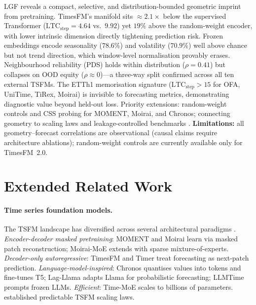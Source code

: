 \documentclass[10pt]{article}
\theoremstyle{definition}
\theoremstyle{remark}
\newcommand{\ltcstep}{\ensuremath{\mathrm{LTC}_{\mathrm{step}}}}
\begin{document}
LGF reveals a compact, selective, and distribution-bounded geometric imprint
from pretraining.
TimesFM's manifold sits ${\approx}2.1\times$ below the supervised Transformer
($\ltcstep{=}4.64$ vs.\ $9.92$) yet $19\%$ above the random-weight encoder,
with lower intrinsic dimension directly tightening prediction risk.
Frozen embeddings encode seasonality ($78.6\%$) and volatility ($70.9\%$)
well above chance but not trend direction, which window-level normalisation
provably erases.
Neighbourhood reliability (PDS) holds within distribution ($\rho{=}0.41$) but
collapses on OOD equity ($\rho{\approx}0$)---a three-way split confirmed across
all ten external TSFMs.
The ETTh1 memorisation signature ($\ltcstep{>}15$ for OFA, UniTime, TiRex,
Moirai) is invisible to forecasting metrics, demonstrating diagnostic value
beyond held-out loss.
Priority extensions: random-weight controls and CSS probing for MOMENT, Moirai,
and Chronos; connecting geometry to scaling laws \citep{edwards2024scalinglaws}
and leakage-controlled benchmarks \citep{aksu2024gifteval,qiu2024tfb}.
\textbf{Limitations:} all geometry--forecast correlations are observational
(causal claims require architecture ablations); random-weight controls are
currently available only for TimesFM~2.0.
\label{sec:limitations}




\appendix

\section{Extended Related Work}
\label{app:related_full}

\paragraph{Time series foundation models.}
The TSFM landscape has diversified across several architectural paradigms
\citep{liang2024foundation,jin2023large,meyer2025tsfmreview}.
\emph{Encoder-decoder masked pretraining}: MOMENT \citep{goswami2024moment}
and Moirai \citep{woo2024moirai} learn via masked patch reconstruction;
Moirai-MoE \citep{woo2024moiraimoe} extends with sparse mixture-of-experts.
\emph{Decoder-only autoregressive}: TimesFM \citep{das2024timesfm} and Timer
\citep{liu2024timer} treat forecasting as next-patch prediction.
\emph{Language-model-inspired}: Chronos \citep{ansari2024chronos} quantises
values into tokens and fine-tunes T5; Lag-Llama \citep{rasul2024lagllama}
adapts Llama for probabilistic forecasting; LLMTime \citep{gruver2023llmts}
prompts frozen LLMs.
\emph{Efficient}: Time-MoE \citep{shi2024timemoe} scales to billions of
parameters.
\citet{edwards2024scalinglaws} established predictable TSFM scaling laws.
\end{document}
